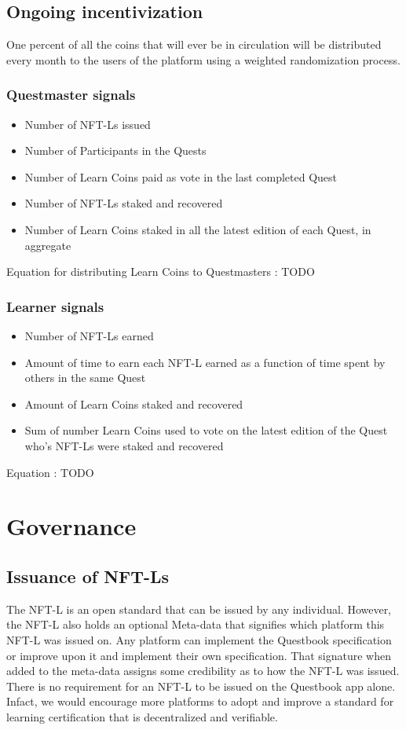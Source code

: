 \documentclass{article}
\begin{document}
    \subsection{Ongoing incentivization}
      One percent of all the coins that will ever be in circulation will be distributed every month to the users of the platform using a weighted randomization process. 
      \subsubsection{Questmaster signals}
        \begin{itemize}
          \item Number of NFT-Ls issued
          \item Number of Participants in the Quests
          \item Number of Learn Coins paid as vote in the last completed Quest
          \item Number of NFT-Ls staked and recovered
          \item Number of Learn Coins staked in all the latest edition of each Quest, in aggregate
        \end{itemize}
        Equation for distributing Learn Coins to Questmasters : TODO
      \subsubsection{Learner signals}  
        \begin{itemize}
          \item Number of NFT-Ls earned
          \item Amount of time to earn each NFT-L earned as a function of time spent by others in the same Quest
          \item Amount of Learn Coins staked and recovered
          \item Sum of number Learn Coins used to vote on the latest edition of the Quest who's NFT-Ls were staked and recovered
        \end{itemize}
        Equation : TODO
  \section{Governance}
    \subsection{Issuance of NFT-Ls}
      The NFT-L is an open standard that can be issued by any individual. However, the NFT-L also holds an optional Meta-data that signifies which platform this NFT-L was issued on.
      Any platform can implement the Questbook specification or improve upon it and implement their own specification. That signature when added to the meta-data assigns some credibility as to how the NFT-L was issued.
      \break
      There is no requirement for an NFT-L to be issued on the Questbook app alone. Infact, we would encourage more platforms to adopt and improve a standard for learning certification that is decentralized and verifiable.
\end{document}
